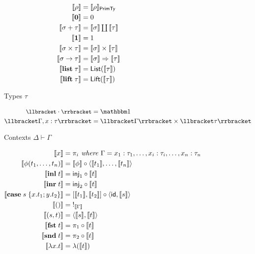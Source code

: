 \begin{figure}
\begin{subfigure}{\linewidth}
  \begin{align*}
  \small
  \llbracket \rho \rrbracket &= \llbracket \rho \rrbracket_{\mathsf{PrimTy}}
  \\
  \llbracket \mathbf{0} \rrbracket &= 0
  \\
  \llbracket \sigma + \tau \rrbracket &= \textstyle {\llbracket \sigma \rrbracket} \coprod {\llbracket \tau \rrbracket}
  \\
  \llbracket \mathbf{1} \rrbracket &= 1
  \\
  \llbracket \sigma \times \tau \rrbracket &= \llbracket \sigma \rrbracket \times \llbracket \tau \rrbracket
  \\
  \llbracket \sigma \to \tau \rrbracket &= \llbracket \sigma \rrbracket \Rightarrow \llbracket \tau \rrbracket
  \\
  \llbracket \mathbf{list}\;\tau \rrbracket &= \mathsf{List}(\llbracket \tau \rrbracket)
  \\
  \llbracket \mathbf{lift}\;\tau \rrbracket &= \mathsf{Lift}(\llbracket \tau \rrbracket)
  \end{align*}
  \caption{Types $\tau$}
  \label{fig:semantics:types}
\end{subfigure}
\begin{subfigure}{\linewidth}
  \begin{align*}
  \small
  \sem{\emptyCxt} &= \One
  \\
  \sem{\Gamma, x: \tau} &= \sem{\Gamma} \times \sem{\tau}
  \end{align*}
  \caption{Contexts $\Delta \vdash \Gamma$}
  \label{fig:semantics:contexts}
\end{subfigure}
\begin{subfigure}{\linewidth}
  \begin{align*}
  \small
  \sem{x} &= \pi_i
  \textit{ where }\Gamma = x_1: \tau_1, \ldots, x_i: \tau_i, \ldots, x_n: \tau_n
  \\
  \sem{\phi(t_1, \ldots, t_n)}
  &=
  \sem{\phi} \comp \prodM{\sem{t_1}}{\ldots, \sem{t_n}}
  \\
  \sem{\tmInl{t}} &= \mathsf{inj}_1 \comp \sem{t}
  \\
  \sem{\tmInr{t}} &= \mathsf{inj}_2 \comp \sem{t}
  \\
  \sem{\tmCase{s}{x}{t_1}{y}{t_2}} &= \coprodM{\sem{t_1}}{\sem{t_2}} \comp \prodM{\id}{\sem{s}}
  \\
  \sem{\tmUnit} &=\;!_{\sem{\Gamma}}
  \\
  \sem{\tmPair{s}{t}} &= \prodM{\sem{s}}{\sem{t}}
  \\
  \sem{\tmFst{t}} &= \pi_1 \comp \sem{t}
  \\
  \sem{\tmSnd{t}} &= \pi_2 \comp \sem{t}
  \\
  \sem{\tmFun{x}{t}} &= \lambda(\sem{t})

\end{align*}
\end{subfigure}
\end{figure}
